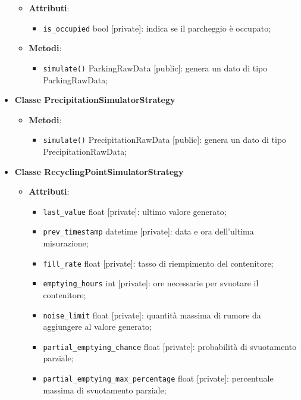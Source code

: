 \begin{itemize}
\begin{itemize}
		      \item \textbf{Attributi}:
		            \begin{itemize}
			            \item \texttt{is\_occupied} bool [private]: indica se il parcheggio è occupato;
		            \end{itemize}
		      \item \textbf{Metodi}:
		            \begin{itemize}
			            \item \texttt{simulate()} ParkingRawData [public]: genera un dato di tipo ParkingRawData;
		            \end{itemize}
	      \end{itemize}
	\item \textbf{Classe PrecipitationSimulatorStrategy}
	      \begin{itemize}
		      \item \textbf{Metodi}:
		            \begin{itemize}
			            \item \texttt{simulate()} PrecipitationRawData [public]: genera un dato di tipo\\ PrecipitationRawData;
		            \end{itemize}
	      \end{itemize}
	\item \textbf{Classe RecyclingPointSimulatorStrategy}
	      \begin{itemize}
		      \item \textbf{Attributi}:
		            \begin{itemize}
			            \item \texttt{last\_value} float [private]: ultimo valore generato;
			            \item \texttt{prev\_timestamp} datetime [private]: data e ora dell'ultima misurazione;
			            \item \texttt{fill\_rate} float [private]: tasso di riempimento del contenitore;
			            \item \texttt{emptying\_hours} int [private]: ore necessarie per svuotare il contenitore;
			            \item \texttt{noise\_limit} float [private]: quantità massima di rumore da aggiungere al valore generato;
			            \item \texttt{partial\_emptying\_chance} float [private]: probabilità di svuotamento parziale;
			            \item \texttt{partial\_emptying\_max\_percentage} float [private]: percentuale massima di svuotamento parziale;

\end{itemize}
\end{itemize}
\end{itemize}
